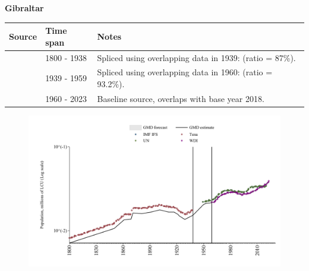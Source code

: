 \documentclass[12pt,a4paper,landscape]{article}
\begin{document}
\begin{adjustbox}{max totalsize={\paperwidth}{\paperheight},center}
\begin{minipage}[t][\textheight][t]{\textwidth}
\vspace*{0.5cm}
{}
\begin{center}
{\Large\bfseries Gibraltar}
\end{center}
\vspace{0.5cm}
\begin{table}[H]
\centering
\small
\begin{tabular}{|l|l|l|}
\hline
\textbf{Source} & \textbf{Time span} & \textbf{Notes} \\
\hline
\rowcolor{white}\cite{Tena}& 1800 - 1938 &Spliced using overlapping data in 1939: (ratio = 87\%).\\
\rowcolor{lightgray}\cite{IMF_IFS}& 1939 - 1959 &Spliced using overlapping data in 1960: (ratio = 93.2\%).\\
\rowcolor{white}\cite{WDI}& 1960 - 2023 &Baseline source, overlaps with base year 2018.\\
\hline
\end{tabular}
\end{table}
\begin{figure}[H]
\centering
\includegraphics[width=\textwidth,height=0.6\textheight,keepaspectratio]{graphs/GIB_pop.pdf}
\end{figure}
\end{minipage}
\end{adjustbox}
\end{document}
